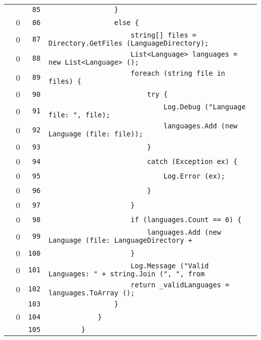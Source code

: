 \documentclass[a4paper,10pt]{article}
\begin{document}
\begin{longtable}[l]{lrrl}
\cellcolor{gray} &  & \verb~85~ & \verb~                }~\\
\cellcolor{red} & 0 & \verb~86~ & \verb~                else {~\\
\cellcolor{red} & 0 & \verb~87~ & \verb~                    string[] files = Directory.GetFiles (LanguageDirectory);~\\
\cellcolor{red} & 0 & \verb~88~ & \verb~                    List<Language> languages = new List<Language> ();~\\
\cellcolor{red} & 0 & \verb~89~ & \verb~                    foreach (string file in files) {~\\
\cellcolor{red} & 0 & \verb~90~ & \verb~                        try {~\\
\cellcolor{red} & 0 & \verb~91~ & \verb~                            Log.Debug ("Language file: ", file);~\\
\cellcolor{red} & 0 & \verb~92~ & \verb~                            languages.Add (new Language (file: file));~\\
\cellcolor{red} & 0 & \verb~93~ & \verb~                        }~\\
\cellcolor{red} & 0 & \verb~94~ & \verb~                        catch (Exception ex) {~\\
\cellcolor{red} & 0 & \verb~95~ & \verb~                            Log.Error (ex);~\\
\cellcolor{red} & 0 & \verb~96~ & \verb~                        }~\\
\cellcolor{red} & 0 & \verb~97~ & \verb~                    }~\\
\cellcolor{red} & 0 & \verb~98~ & \verb~                    if (languages.Count == 0) {~\\
\cellcolor{red} & 0 & \verb~99~ & \verb~                        languages.Add (new Language (file: LanguageDirectory +~\\
\cellcolor{red} & 0 & \verb~100~ & \verb~                    }~\\
\cellcolor{red} & 0 & \verb~101~ & \verb~                    Log.Message ("Valid Languages: " + string.Join (", ", from~\\
\cellcolor{red} & 0 & \verb~102~ & \verb~                    return _validLanguages = languages.ToArray ();~\\
\cellcolor{gray} &  & \verb~103~ & \verb~                }~\\
\cellcolor{red} & 0 & \verb~104~ & \verb~            }~\\
\cellcolor{gray} &  & \verb~105~ & \verb~        }~\\

\end{longtable}
\end{document}
